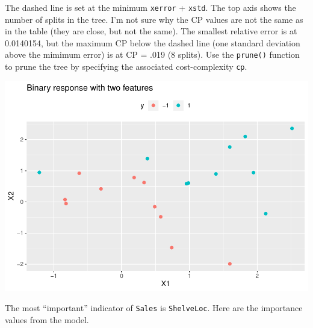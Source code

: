 \documentclass[
]{book}
\newenvironment{Shaded}{\begin{snugshade}}{\end{snugshade}}
\newcommand{\DataTypeTok}[1]{\textcolor[rgb]{0.13,0.29,0.53}{#1}}
\newcommand{\DecValTok}[1]{\textcolor[rgb]{0.00,0.00,0.81}{#1}}
\newcommand{\KeywordTok}[1]{\textcolor[rgb]{0.13,0.29,0.53}{\textbf{#1}}}
\newcommand{\NormalTok}[1]{#1}
\newcommand{\OperatorTok}[1]{\textcolor[rgb]{0.81,0.36,0.00}{\textbf{#1}}}
\newcommand{\OtherTok}[1]{\textcolor[rgb]{0.56,0.35,0.01}{#1}}
\newcommand{\StringTok}[1]{\textcolor[rgb]{0.31,0.60,0.02}{#1}}
\begin{document}
The dashed line is set at the minimum \texttt{xerror} + \texttt{xstd}. The top axis shows the number of splits in the tree. I'm not sure why the CP values are not the same as in the table (they are close, but not the same). The smallest relative error is at 0.0140154, but the maximum CP below the dashed line (one standard deviation above the mimimum error) is at CP = .019 (8 splits). Use the \texttt{prune()} function to prune the tree by specifying the associated cost-complexity \texttt{cp}.

\begin{Shaded}
\end{Shaded}

\includegraphics{data-sci_files/figure-latex/unnamed-chunk-92-1.pdf}

The most ``important'' indicator of \texttt{Sales} is \texttt{ShelveLoc}. Here are the importance values from the model.
\end{document}
